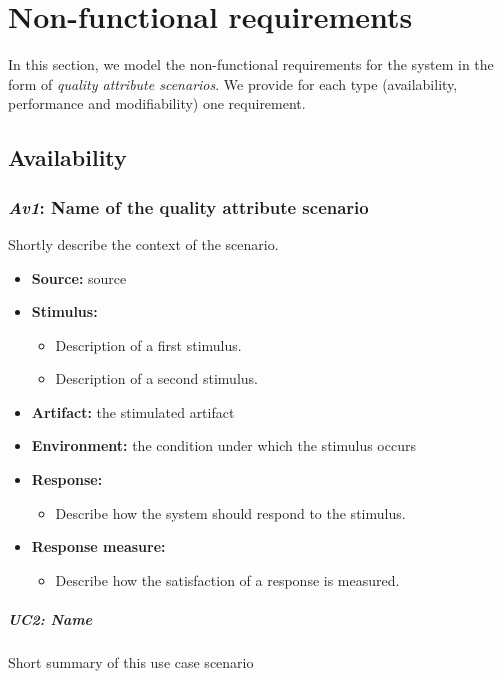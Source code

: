 \documentclass[english,peerreview]{sareport}
\begin{document}
\chapter{Non-functional requirements}\label{sec:non-functional}
In this section, we model the non-functional requirements for the system in the
form of \emph{quality attribute scenarios}. We provide for each type
(availability, performance and modifiability) one requirement.

\section{Availability}
\subsection{\emph{Av1}: Name of the quality attribute scenario}
Shortly describe the context of the scenario.

\begin{itemize}
    \item \textbf{Source:} source
    \item \textbf{Stimulus:}
        \begin{itemize}
            \item Description of a first stimulus.
            \item Description of a second stimulus.
        \end{itemize}

    \item \textbf{Artifact:} the stimulated artifact
    \item \textbf{Environment:} the condition under which the stimulus occurs
    \item \textbf{Response:}
        \begin{itemize}
            \item Describe how the system should respond to the stimulus.
        \end{itemize}

    \item \textbf{Response measure:}
        \begin{itemize}
            \item Describe how the satisfaction of a response is measured.
        \end{itemize}
\end{itemize}

\paragraph{UC2: Name}
Short summary of this use case scenario
\end{document}
